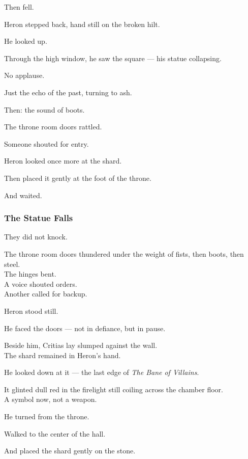 \documentclass[12pt]{article}
\begin{document}
Then fell.

\vspace{1em}

Heron stepped back, hand still on the broken hilt.

He looked up.

Through the high window, he saw the square — his statue collapsing.

No applause.

Just the echo of the past, turning to ash.

Then: the sound of boots.

The throne room doors rattled.

Someone shouted for entry.

Heron looked once more at the shard.

Then placed it gently at the foot of the throne.

And waited.

\dotfill

\subsubsection*{The Statue Falls}

They did not knock.

The throne room doors thundered under the weight of fists, then boots, then steel.\\
The hinges bent.\\
A voice shouted orders.\\
Another called for backup.

Heron stood still.

He faced the doors — not in defiance, but in pause.

Beside him, Critias lay slumped against the wall.\\
The shard remained in Heron’s hand.

\vspace{1em}

He looked down at it — the last edge of \textit{The Bane of Villains}.

It glinted dull red in the firelight still coiling across the chamber floor.\\
A symbol now, not a weapon.

He turned from the throne.

Walked to the center of the hall.

And placed the shard gently on the stone.

\vspace{1em}
\end{document}
